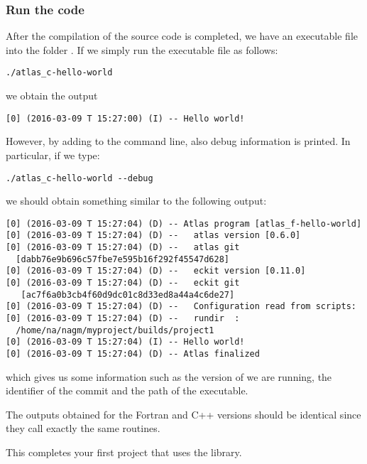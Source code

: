 \subsubsection*{Run the code}
After the compilation of the source code is completed, 
we have an executable file into the folder .
If we simply run the executable file as follows:
%
\begin{lstlisting}[style=BashStyle]
./atlas_c-hello-world
\end{lstlisting}
% 
we obtain the output
\begin{lstlisting}[style=BashStyle]
[0] (2016-03-09 T 15:27:00) (I) -- Hello world!
\end{lstlisting}
%
However, by adding  to the command line,
also debug information is printed.
In particular, if we type:
%
\begin{lstlisting}[style=BashStyle]
./atlas_c-hello-world --debug
\end{lstlisting}
%
we should obtain something similar to the following output:
%
\begin{lstlisting}[style=BashStyle]
[0] (2016-03-09 T 15:27:04) (D) -- Atlas program [atlas_f-hello-world]
[0] (2016-03-09 T 15:27:04) (D) --   atlas version [0.6.0]
[0] (2016-03-09 T 15:27:04) (D) --   atlas git     
  [dabb76e9b696c57fbe7e595b16f292f45547d628]
[0] (2016-03-09 T 15:27:04) (D) --   eckit version [0.11.0]
[0] (2016-03-09 T 15:27:04) (D) --   eckit git    
   [ac7f6a0b3cb4f60d9dc01c8d33ed8a44a4c6de27]
[0] (2016-03-09 T 15:27:04) (D) --   Configuration read from scripts:
[0] (2016-03-09 T 15:27:04) (D) --   rundir  :
  /home/na/nagm/myproject/builds/project1
[0] (2016-03-09 T 15:27:04) (I) -- Hello world!
[0] (2016-03-09 T 15:27:04) (D) -- Atlas finalized

\end{lstlisting}
%
which gives us some information such as the version of \Atlas we are 
running, the identifier of the commit and the path of the executable. 
\begin{tipbox}
The outputs obtained for the Fortran and C++ versions should be identical
since they call exactly the same routines. 
\end{tipbox}

This completes your first project that uses the \Atlas library.






